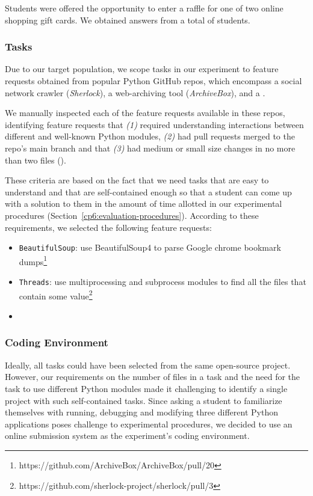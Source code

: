 Students were offered the opportunity to enter a raffle for one of two  online shopping gift cards.
We obtained answers from a total of \red{\#} students. 


\subsubsection{Tasks}

Due to our target population, we scope tasks in our experiment to  
feature requests obtained from popular Python GitHub repos,
which encompass a social network crawler (\textit{Sherlock}),
a web-archiving tool (\textit{ArchiveBox}), and a .



We manually inspected each of the feature requests available in these repos, identifying
feature requests that
\textit{(1)}  required understanding interactions between different and well-known Python modules, 
\textit{(2)}  had pull requests merged to the repo's main branch and that
\textit{(3)}  had medium or small size changes in no more than two files ().


These criteria are based on the fact that we need tasks that are easy to understand and that are self-contained enough so that a student can come up with a solution to them in the amount of time allotted in our experimental procedures (Section~\ref{cp6:evaluation-procedures}).
According to these requirements, we selected the following feature requests:


\begin{itemize}
    \item \texttt{BeautifulSoup}: use BeautifulSoup4 to parse Google chrome bookmark dumps\footnote{https://github.com/ArchiveBox/ArchiveBox/pull/20}
    \item  \texttt{Threads}: use multiprocessing and subprocess modules to find all the files that contain some value\footnote{https://github.com/sherlock-project/sherlock/pull/3}
    \item {}
\end{itemize}



\subsubsection{Coding Environment}


Ideally, all tasks could have been selected from the same open-source project. However, our requirements on the number of files in a task and the need for the task to use different Python modules made it challenging to identify a single project with such self-contained tasks. Since asking a student to familiarize themselves with running, debugging and modifying three different Python applications 
poses challenge to experimental procedures, we decided to use 
an online submission system as the experiment's coding environment.



